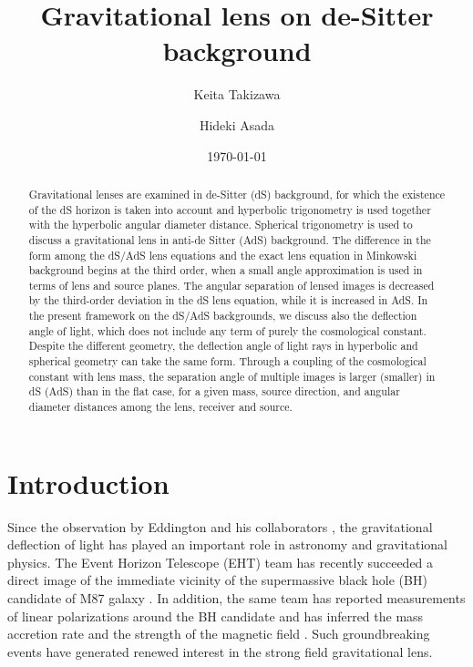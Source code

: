 \documentclass[twocolumn,showpacs,preprintnumbers,amsmath,amssymb]{revtex4-1}
\begin{document}
\title{
Gravitational lens on de-Sitter background
} 
\author{Keita Takizawa}
\author{Hideki Asada} 
\date{\today}

\begin{abstract} 
Gravitational lenses are examined in de-Sitter (dS) background, 
for which the existence of the dS horizon is taken into account and 
hyperbolic trigonometry is used together with 
the hyperbolic angular diameter distance. 
Spherical trigonometry is used to discuss 
a gravitational lens in anti-de Sitter (AdS) background. 
The difference in the form among the dS/AdS lens equations 
and the exact lens equation in Minkowski background 
begins at the third order, 
when a small angle approximation is used 
in terms of lens and source planes. 
The angular separation of lensed images is 
decreased by the third-order deviation in the dS lens equation, 
while it is increased in AdS. 
In the present framework on the dS/AdS backgrounds, 
we discuss also the deflection angle of light, 
which does not include any term of purely the cosmological constant.  
Despite the different geometry, 
the deflection angle of light rays 
in hyperbolic and spherical geometry 
can take the same form. 
Through a coupling of the cosmological constant 
with lens mass, 
the separation angle of multiple images 
is larger (smaller) in dS (AdS) than in the flat case, 
for a given mass, source direction, and angular diameter distances 
among the lens, receiver and source.


\end{abstract}


\maketitle



\section{Introduction}
Since the observation by Eddington and his collaborators 
\cite{Eddington}, 
the gravitational deflection of light has played an important role 
in astronomy and gravitational physics. 
The Event Horizon Telescope (EHT) team has recently succeeded 
a direct image of the immediate vicinity of the supermassive black hole (BH) 
candidate of M87 galaxy \cite{EHT}. 
In addition, the same team has reported measurements 
of linear polarizations around the BH candidate
\cite{EHT2021a} 
and has inferred the mass accretion rate and 
the strength of the magnetic field \cite{EHT2021b}. 
Such groundbreaking events have generated 
renewed interest in the strong field gravitational lens. 
\end{document}
